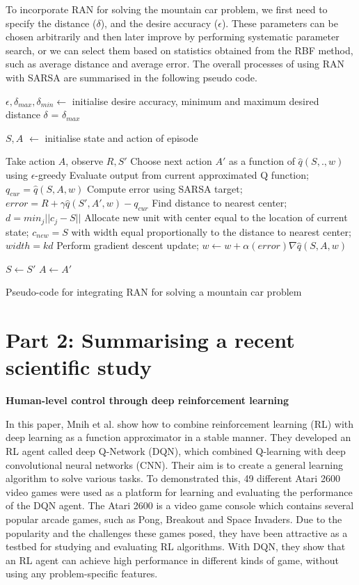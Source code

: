 \documentclass[12pt,letterpaper]{article}
\begin{document}
To incorporate RAN for solving the mountain car problem, we first need to specify the distance ($\delta$), and the desire accuracy ($\epsilon$).
These parameters can be chosen arbitrarily and then later improve by performing systematic parameter search, 
or we can select them based on statistics obtained from the RBF method, such as average distance and average error.
The overall processes of using RAN with SARSA are summarised in the following pseudo code.

\begin{algorithm}
  \SetAlgoLined
   $\epsilon,\delta_{max},\delta_{min} \leftarrow$ initialise desire accuracy, minimum and maximum desired distance\;
   $\delta$ = ${\delta}_{max}$\;
    {
    $S, A$ $\leftarrow$ initialise state and action of episode\;
    {
    Take action $A$, observe $R, S'$\;
    Choose next action $A'$ as a function of $\hat{q}(S,.,w)$ using $\epsilon$-greedy\;
    Evaluate output from current approximated Q function; $q_{cur} = \hat{q}(S,A,w)$\;
    Compute error using SARSA target; $error = R+\gamma\hat{q}(S',A',w) - q_{cur}$\;
    Find distance to nearest center; $d = min_j||c_j-S||$\;
    {
      Allocate new unit with center equal to the location of current state; $c_{new} = S$
      with width equal proportionally to the distance to nearest center; $width = kd$
    }{
      Perform gradient descent update; $w \leftarrow w + \alpha (error)\nabla \hat{q}(S,A,w)$
    }

    $S \leftarrow S'$\;
    $A \leftarrow A'$\;

   }
   }
   \caption{Pseudo-code for integrating RAN for solving a mountain car problem}
  \end{algorithm}


\section*{Part 2: Summarising a recent scientific study}
\textbf{Human-level control through deep reinforcement learning}

In this paper, Mnih et al. show how to combine reinforcement learning (RL) with deep learning as a function approximator in a stable manner.
They developed an RL agent called deep Q-Network (DQN), which combined Q-learning with deep convolutional neural networks (CNN).
Their aim is to create a general learning algorithm to solve various tasks. 
To demonstrated this, 49 different Atari 2600 video games were used as a platform for learning and evaluating the performance of the DQN agent.
The Atari 2600 is a video game console which contains several popular arcade games, such as Pong, Breakout and Space Invaders.
Due to the popularity and the challenges these games posed, they have been attractive as a testbed for studying and evaluating RL algorithms.
With DQN, they show that an RL agent can achieve high performance in different kinds of game, without using any problem-specific features.
\end{document}
